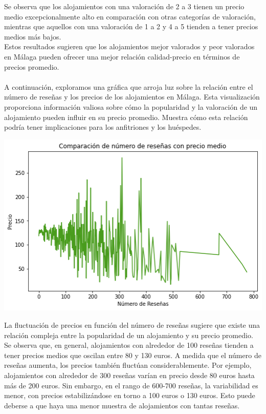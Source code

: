 Se observa que los alojamientos con una valoración de 2 a 3 tienen un precio medio excepcionalmente alto en comparación con otras categorías de valoración, mientras que aquellos con una valoración de 1 a 2 y 4 a 5 tienden a tener precios medios más bajos. \\Estos resultados sugieren que los alojamientos mejor valorados y peor valorados en Málaga pueden ofrecer una mejor relación calidad-precio en términos de precios promedio.
\ \\\\
A continuación, exploramos una gráfica que arroja luz sobre la relación entre el número de reseñas y los precios de los alojamientos en Málaga. Esta visualización proporciona información valiosa sobre cómo la popularidad y la valoración de un alojamiento pueden influir en su precio promedio. Muestra cómo esta relación podría tener implicaciones para los anfitriones y los huéspedes.
\begin{center}
    \centering
    \includegraphics[width=1\textwidth]{capturas/17.png}
\end{center}
La fluctuación de precios en función del número de reseñas sugiere que existe una relación compleja entre la popularidad de un alojamiento y su precio promedio. Se observa que, en general, alojamientos con alrededor de 100 reseñas tienden a tener precios medios que oscilan entre 80 y 130 euros. A medida que el número de reseñas aumenta, los precios también fluctúan considerablemente. Por ejemplo, alojamientos con alrededor de 300 reseñas varían en precio desde 80 euros hasta más de 200 euros. Sin embargo, en el rango de 600-700 reseñas, la variabilidad es menor, con precios estabilizándose en torno a 100 euros o 130 euros. Esto puede deberse a que haya una menor muestra de alojamientos con tantas reseñas.
\newpage